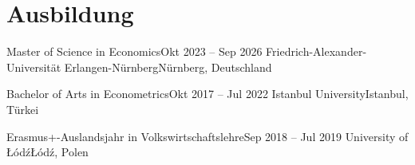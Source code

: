 \section{Ausbildung}
    \resumeSubHeadingListStart

    \resumeSubheading
    {Master of Science in Economics}{Okt 2023 -- Sep 2026}
    {Friedrich-Alexander-Universität Erlangen-Nürnberg}{Nürnberg, Deutschland}
    \resumeItemListStart
    \resumeItemListEnd

        \resumeSubheading
    {Bachelor of Arts in Econometrics}{Okt 2017 -- Jul 2022}
    {Istanbul University}{Istanbul, Türkei}

        \resumeSubheading
    {Erasmus+-Auslandsjahr in Volkswirtschaftslehre}{Sep 2018 -- Jul 2019}
    {University of Łódź}{Łódź, Polen}

    \resumeSubHeadingListEnd
